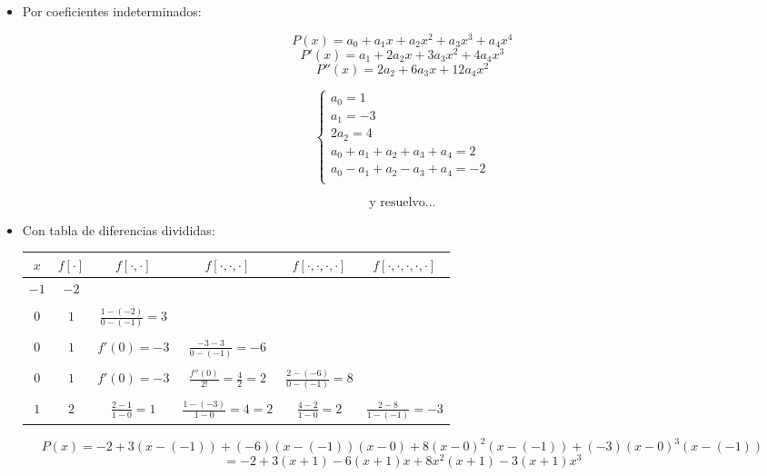 \begin{itemize}
	\item Por coeficientes indeterminados:
	
	$$P(x) = a_{0} + a_{1}x + a_{2}x^{2} + a_{3}x^{3} + a_{4}x^{4}$$
	$$P'(x) = a_{1} + 2a_{2}x + 3a_{3}x^{2} + 4a_{4}x^{3}$$
	$$P''(x) = 2a_{2} + 6a_{3}x + 12a_{4}x^{2}$$

	$$
    \begin{cases}
        a_{0} = 1\\
        a_{1} = -3\\
        2a_{2} = 4\\
        a_{0} + a_{1} + a_{2} + a_{3} + a_{4} = 2\\
        a_{0} - a_{1} + a_{2} - a_{3} + a_{4} = -2\\ 
    \end{cases}
	$$

	$$\text{y resuelvo...}$$
	
	\item Con tabla de diferencias divididas:\\
	
	\begin{table}[h]
    \centering
    \begin{tabular}{c|c|c|c|c|c}
        $x$ & $f[\cdot]$ & $f[\cdot, \cdot]$ & $f[\cdot, \cdot, \cdot]$ & $f[\cdot, \cdot, \cdot, \cdot]$ & $f[\cdot, \cdot, \cdot, \cdot, \cdot]$\\ \hline
        $-1$ & $-2$ &  & & &\\
        &&&&&\\
        $0$ & $1$ & $\frac{1 - (-2)}{0 - (-1)} = 3$ & & & \\
        &&&&&\\
        $0$ & $1$ & $f'(0) = -3$ & $\frac{-3 - 3}{0 - (-1)} = -6$ & &\\
        &&&&&\\
        $0$ & $1$ & $f'(0) = -3$ & $\frac{f''(0)}{2!} = \frac{4}{2} = 2$ & $\frac{2 - (-6)}{0 - (-1)} = 8$ &\\
        &&&&&\\
        $1$ & $2$ & $\frac{2 - 1}{1 - 0} = 1$ & $\frac{1 - (-3)}{1 - 0} = 4 = 2$ & $\frac{4 - 2}{1 - 0} = 2$ & $\frac{2 - 8}{1 - (-1)} = -3$\\
    \end{tabular}
\end{table}

$$P(x) = -2 + 3(x - (-1)) + (-6)(x - (-1))(x - 0) + 8(x - 0)^{2}(x - (-1)) + (-3)(x - 0)^{3}(x - (-1))$$
$$ = -2 + 3(x + 1) - 6(x + 1)x + 8x^{2}(x + 1) - 3(x + 1)x^{3}$$\\

\end{itemize}

